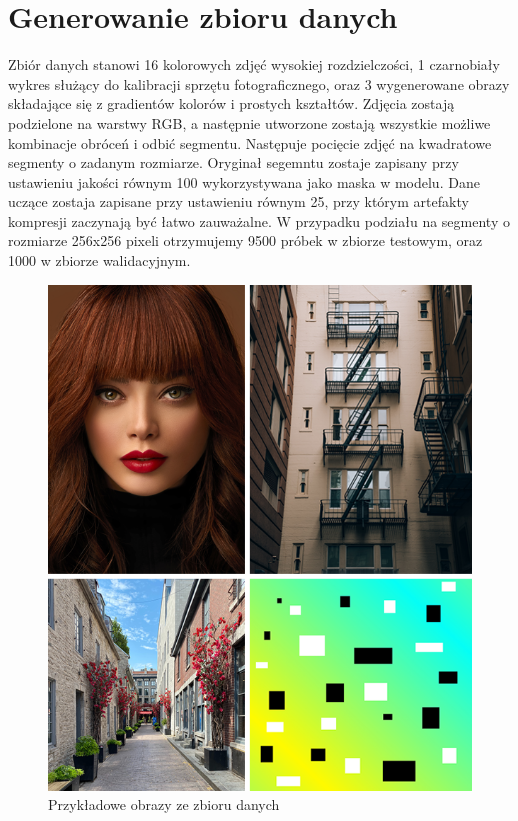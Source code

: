 \documentclass[a4paper, 12pt]{article}
\begin{document}
\section{Generowanie zbioru danych}
Zbiór danych stanowi 16 kolorowych zdjęć wysokiej rozdzielczości, 1 czarnobiały wykres służący do kalibracji sprzętu fotograficznego,
oraz 3 wygenerowane obrazy składające się z gradientów kolorów i prostych kształtów.
Zdjęcia zostają podzielone na warstwy RGB, a następnie utworzone zostają wszystkie możliwe kombinacje obróceń i odbić segmentu.
Następuje pocięcie zdjęć na kwadratowe segmenty o zadanym rozmiarze.
Oryginał segemntu zostaje zapisany przy ustawieniu jakości równym 100 wykorzystywana jako maska w modelu.
Dane uczące zostaja zapisane przy ustawieniu równym 25, przy którym artefakty kompresji zaczynają być łatwo zauważalne.
W przypadku podziału na segmenty o rozmiarze 256x256 pixeli otrzymujemy 9500 próbek w zbiorze testowym, oraz 1000 w zbiorze walidacyjnym.
\begin{figure}[h!]
\begin{center}
	\includegraphics[width=0.85\columnwidth]{dataset.png}
	\caption{Przykładowe obrazy ze zbioru danych}
\end{center}
\end{figure}

\newpage
\end{document}
